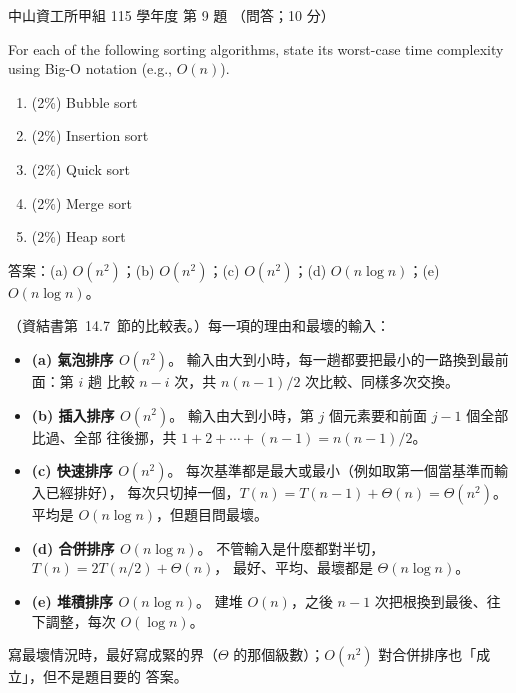 \begin{pastexam}[label={px:nsysu-115-osds-05}]{中山資工所甲組 115 學年度 第 9 題}
（問答；10 分）

For each of the following sorting algorithms, state its worst-case time complexity using Big-O
notation (e.g., $O(n)$).
\begin{enumerate}[label=(\alph*)]
\item (2\%) Bubble sort
\item (2\%) Insertion sort
\item (2\%) Quick sort
\item (2\%) Merge sort
\item (2\%) Heap sort
\end{enumerate}
\end{pastexam}

\begin{pastsoln}
答案：(a) $O(n^2)$；(b) $O(n^2)$；(c) $O(n^2)$；(d) $O(n \log n)$；(e) $O(n \log n)$。

（資結書第~14.7~節的比較表。）每一項的理由和最壞的輸入：
\begin{itemize}
\item \textbf{(a) 氣泡排序 $O(n^2)$}。 輸入由大到小時，每一趟都要把最小的一路換到最前面：第 $i$ 趟
比較 $n - i$ 次，共 $n(n-1)/2$ 次比較、同樣多次交換。
\item \textbf{(b) 插入排序 $O(n^2)$}。 輸入由大到小時，第 $j$ 個元素要和前面 $j - 1$ 個全部比過、全部
往後挪，共 $1 + 2 + \cdots + (n - 1) = n(n-1)/2$。
\item \textbf{(c) 快速排序 $O(n^2)$}。 每次基準都是最大或最小（例如取第一個當基準而輸入已經排好），
每次只切掉一個，$T(n) = T(n - 1) + \Theta(n) = \Theta(n^2)$。 平均是 $O(n \log n)$，但題目問最壞。
\item \textbf{(d) 合併排序 $O(n \log n)$}。 不管輸入是什麼都對半切，$T(n) = 2T(n/2) + \Theta(n)$，
最好、平均、最壞都是 $\Theta(n \log n)$。
\item \textbf{(e) 堆積排序 $O(n \log n)$}。 建堆 $O(n)$，之後 $n - 1$ 次把根換到最後、往下調整，每次
$O(\log n)$。
\end{itemize}
寫最壞情況時，最好寫成緊的界（$\Theta$ 的那個級數）；$O(n^2)$ 對合併排序也「成立」，但不是題目要的
答案。
\end{pastsoln}

